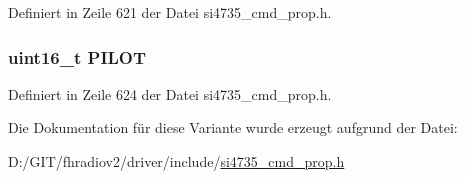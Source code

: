 Definiert in Zeile 621 der Datei si4735\+\_\+cmd\+\_\+prop.\+h.

\hypertarget{unionfm__rsq__blend__thres_acfac363989b431911806622060eda094}{}
\subsubsection[{P\+I\+L\+O\+T}]{\setlength{\rightskip}{0pt plus 5cm}uint16\+\_\+t P\+I\+L\+O\+T}\label{unionfm__rsq__blend__thres_acfac363989b431911806622060eda094}


Definiert in Zeile 624 der Datei si4735\+\_\+cmd\+\_\+prop.\+h.



Die Dokumentation für diese Variante wurde erzeugt aufgrund der Datei\+:\begin{DoxyCompactItemize}
\item 
D\+:/\+G\+I\+T/fhradiov2/driver/include/\hyperlink{si4735__cmd__prop_8h}{si4735\+\_\+cmd\+\_\+prop.\+h}\end{DoxyCompactItemize}
